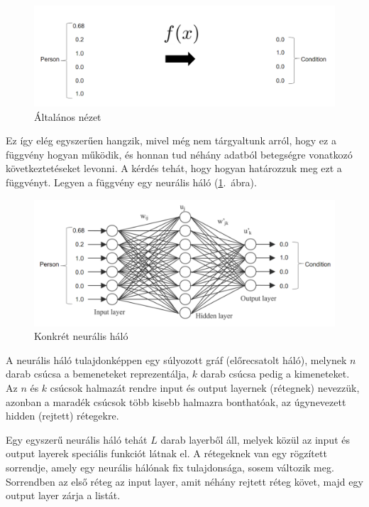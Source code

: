 \begin{figure}[h!]
  
	\begin{center}
	\includegraphics[width=\linewidth]{fgv.png}
	\end{center}
  \caption{Általános nézet}
\end{figure}

Ez így elég egyszerűen hangzik, mivel még nem tárgyaltunk arról, hogy ez a függvény hogyan működik, és honnan tud néhány adatból betegségre vonatkozó következtetéseket levonni. A kérdés tehát, hogy hogyan határozzuk meg ezt a függvényt. Legyen a függvény egy neurális háló (\ref{ab1.2}.~ábra).

\begin{figure}[h!]
 
 \begin{center}
	\includegraphics[width=.9\linewidth]{fgv_network.png}
 \end{center}

  \caption{Konkrét neurális háló}\label{ab1.2}
\end{figure}


A neurális háló tulajdonképpen egy súlyozott gráf (előrecsatolt háló), melynek $n$ darab csúcsa a bemeneteket reprezentálja, $k$ darab csúcsa pedig a kimeneteket. Az $n$ és $k$ csúcsok halmazát rendre input és output layernek (rétegnek) nevezzük, azonban a maradék csúcsok több kisebb halmazra bonthatóak, az úgynevezett hidden (rejtett) rétegekre. 

Egy egyszerű neurális háló tehát $L$ darab layerből áll, melyek közül az input és output layerek speciális funkciót látnak el. A rétegeknek van egy rögzített sorrendje, amely egy neurális hálónak fix tulajdonsága, sosem változik meg. Sorrendben az első réteg az input layer, amit néhány rejtett réteg követ, majd egy output layer zárja a listát.

